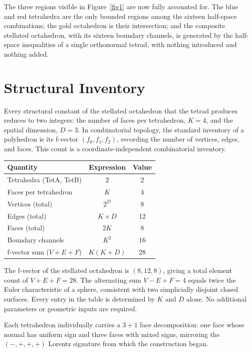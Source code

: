\documentclass[twocolumn]{iopjournal}
\begin{document}
The three regions visible in Figure~\ref{fig1} are now fully accounted
for. The blue and red tetrahedra are the only bounded regions among the
sixteen half-space combinations; the gold octahedron is their intersection;
and the composite stellated octahedron, with its sixteen boundary channels,
is generated by the half-space inequalities of a single orthonormal tetrad,
with nothing introduced and nothing added.

\section*{Structural Inventory}

Every structural constant of the stellated octahedron that the tetrad produces reduces to two integers: the number of faces per tetrahedron, $K = 4$, and the spatial dimension, $D = 3$. In combinatorial topology, the standard inventory of a polyhedron is its f-vector $(f_0, f_1, f_2)$, recording the number of vertices, edges, and faces. This count is a coordinate-independent combinatorial inventory.

\vspace{6pt}
\noindent
\begin{tabular*}{\columnwidth}{@{\extracolsep{\fill}}lcc@{}}
\hline
Quantity & Expression & Value \\
\hline
Tetrahedra (TetA, TetB) & $2$ & 2 \\
Faces per tetrahedron & $K$ & 4 \\
Vertices (total) & $2^D$ & 8 \\
Edges (total) & $K \times D$ & 12 \\
Faces (total) & $2K$ & 8 \\
Boundary channels & $K^2$ & 16 \\
f-vector sum ($V\!+\!E\!+\!F$) & $K(K\!+\!D)$ & 28 \\
\hline
\end{tabular*}
\vspace{6pt}

\noindent
The f-vector of the stellated octahedron is $(8, 12, 8)$, giving a total element count of $V + E + F = 28$. The alternating sum $V - E + F = 4$ equals twice the Euler characteristic of a sphere, consistent with two simplicially disjoint closed surfaces. Every entry in the table is determined by $K$ and $D$ alone. No additional parameters or geometric inputs are required.

Each tetrahedron individually carries a $3+1$ face decomposition: one face whose normal has uniform sign and three faces with mixed signs, mirroring the $(-,+,+,+)$ Lorentz signature from which the construction began.
\end{document}
